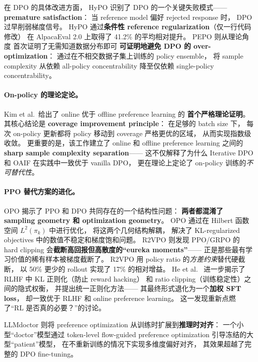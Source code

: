 在 DPO 的具体改进方面，
HyPO \cite{hypo2026} 识别了 DPO 的一个关键失败模式——
\textbf{premature satisfaction}：
当 reference model 偏好 rejected response 时，
DPO 过早削弱梯度信号。
HyPO 通过\textbf{条件性 reference regularization}（仅一行代码修改）
在 AlpacaEval 2.0 上取得了 41.2\% 的平均相对提升。
PEPO \cite{barla2026pepo} 则从理论角度
首次证明了无需知道数据分布即可
\textbf{可证明地避免 DPO 的 over-optimization}：
通过在不相交数据子集上训练的 policy ensemble，
将 sample complexity 从依赖 all-policy concentrability
降至仅依赖 single-policy concentrability。

\paragraph{On-policy 的理论定论。}
 Kim et al.\ 给出了 online 优于 offline preference learning 的
\textbf{首个严格理论证明}。
其核心结论是 \textbf{coverage improvement principle}：
在足够的 batch size 下，
每次 on-policy 更新都将 policy 移动到 coverage 严格更优的区域，
从而实现指数级收敛。
更重要的是，该工作建立了 online 和 offline preference learning 之间的
\textbf{sharp sample complexity separation}——
这不仅解释了为什么 Iterative DPO 和 OAIF
在实践中一致优于 vanilla DPO，
更在理论上定论了 on-policy 训练的\emph{不可替代性}。

\paragraph{PPO 替代方案的进化。}
OPO \cite{wang2026opo} 揭示了 PPO 和 DPO 共同存在的一个结构性问题：
\textbf{两者都混淆了 sampling geometry 和 optimization geometry}。
OPO 通过在 Hilbert 函数空间 $L^2(\pi_k)$ 中进行优化，
将这两个几何结构解耦，
解决了 KL-regularized objectives 中的数值不稳定和梯度饱和问题。
R2VPO \cite{luo2026r2vpo} 则发现
PPO/GRPO 的 hard clipping 会\textbf{截断高回报但高散度的``eureka moments''}——
正是那些最有学习价值的稀有样本被梯度截断了。
R2VPO 用 policy ratio 的\emph{方差约束}替代硬截断，
以 50\% 更少的 rollout 实现了 17\% 的相对增益。
He et al.\ \cite{he2026unifiedrlhf}
进一步揭示了 RLHF 中 KL 正则化（防止 reward hacking）
和 ratio clipping（训练稳定性）之间的隐式权衡，
并提出统一正则化方法——
其最终形式退化为一个\textbf{加权 SFT loss}，
却一致优于 RLHF 和 online preference learning。
这一发现重新点燃了``RL 是否真的必要？''的讨论。

LLMdoctor \cite{llmdoctor2026} 则将 preference optimization
从训练时扩展到\textbf{推理时对齐}：
一个小型``doctor''模型通过 token-level flow-guided preference optimization
引导冻结的大型``patient''模型，
在不重新训练的情况下实现多维度偏好对齐，
其效果超越了完整的 DPO fine-tuning。


